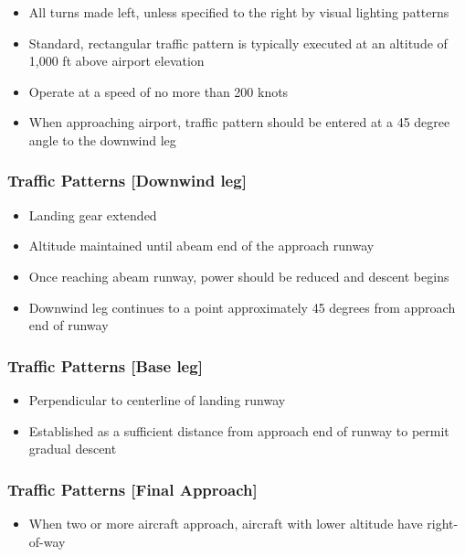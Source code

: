 \documentclass{article}
\begin{document}
\begin{itemize}
\item All turns made left, unless specified to the right by visual lighting patterns
\item Standard, rectangular traffic pattern is typically executed at an altitude of 1,000 ft above airport elevation
\item Operate at a speed of no more than 200 knots
\item When approaching airport, traffic pattern should be entered at a 45 degree angle to the downwind leg
\end{itemize}

\subsubsection*{Traffic Patterns [Downwind leg]}

\begin{itemize}
\item Landing gear extended
\item Altitude maintained until abeam end of the approach runway
\item Once reaching abeam runway, power should be reduced and descent begins
\item Downwind leg continues to a point approximately 45 degrees from approach end of runway
\end{itemize}

\subsubsection*{Traffic Patterns [Base leg]}

\begin{itemize}
\item Perpendicular to centerline of landing runway
\item Established as a sufficient distance from approach end of runway to permit gradual descent
\end{itemize}

\subsubsection*{Traffic Patterns [Final Approach]}

\begin{itemize}
\item When two or more aircraft approach, aircraft with lower altitude have right-of-way
\end{itemize}
\end{document}

